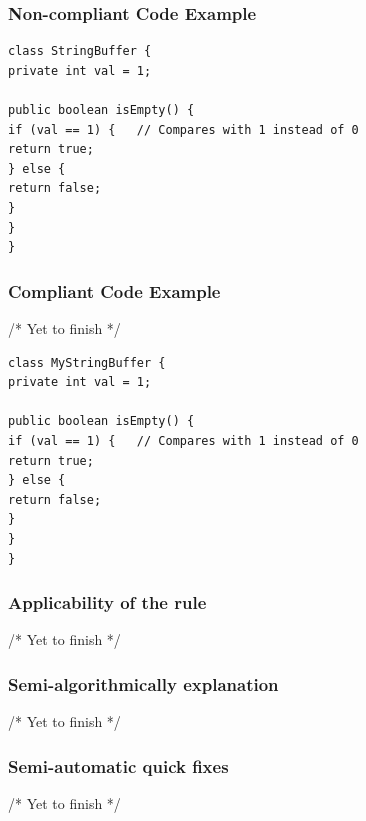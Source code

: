 \subsubsection{Non-compliant Code Example}
\begin{lstlisting}
class StringBuffer {
private int val = 1;

public boolean isEmpty() {
if (val == 1) {   // Compares with 1 instead of 0
return true;
} else {
return false;
}
}
}
\end{lstlisting}
\subsubsection{Compliant Code Example}
/* Yet to finish */
\begin{lstlisting}
class MyStringBuffer {
private int val = 1;

public boolean isEmpty() {
if (val == 1) {   // Compares with 1 instead of 0
return true;
} else {
return false;
}
}
}
\end{lstlisting}
\subsubsection{Applicability of the rule}
/* Yet to finish */
\subsubsection{Semi-algorithmically explanation}
/* Yet to finish */
\subsubsection{Semi-automatic quick fixes} 
/* Yet to finish */
 




